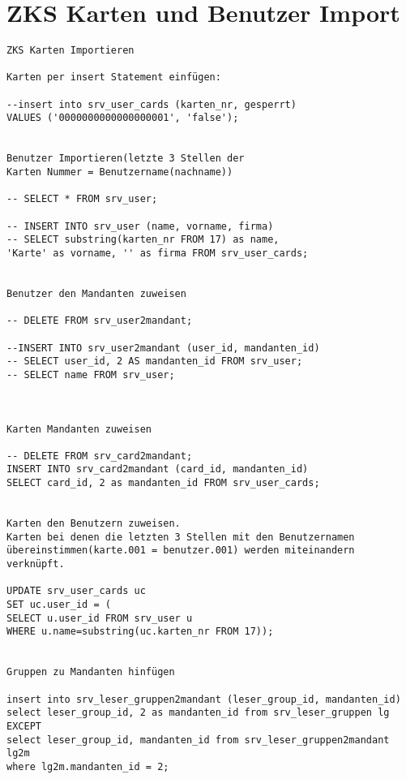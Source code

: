 \documentclass[a4paper,10pt]{report}
\begin{document}
\section{ZKS Karten und Benutzer Import}
\begin{verbatim}
ZKS Karten Importieren

Karten per insert Statement einfügen:

--insert into srv_user_cards (karten_nr, gesperrt) 
VALUES ('0000000000000000001', 'false');


Benutzer Importieren(letzte 3 Stellen der 
Karten Nummer = Benutzername(nachname))

-- SELECT * FROM srv_user;

-- INSERT INTO srv_user (name, vorname, firma)
-- SELECT substring(karten_nr FROM 17) as name, 
'Karte' as vorname, '' as firma FROM srv_user_cards;


Benutzer den Mandanten zuweisen

-- DELETE FROM srv_user2mandant;

--INSERT INTO srv_user2mandant (user_id, mandanten_id)
-- SELECT user_id, 2 AS mandanten_id FROM srv_user;
-- SELECT name FROM srv_user;



Karten Mandanten zuweisen

-- DELETE FROM srv_card2mandant;
INSERT INTO srv_card2mandant (card_id, mandanten_id)
SELECT card_id, 2 as mandanten_id FROM srv_user_cards;


Karten den Benutzern zuweisen. 
Karten bei denen die letzten 3 Stellen mit den Benutzernamen 
übereinstimmen(karte.001 = benutzer.001) werden miteinandern verknüpft.

UPDATE srv_user_cards uc
SET uc.user_id = (
SELECT u.user_id FROM srv_user u 
WHERE u.name=substring(uc.karten_nr FROM 17));


Gruppen zu Mandanten hinfügen

insert into srv_leser_gruppen2mandant (leser_group_id, mandanten_id)
select leser_group_id, 2 as mandanten_id from srv_leser_gruppen lg
EXCEPT 
select leser_group_id, mandanten_id from srv_leser_gruppen2mandant lg2m
where lg2m.mandanten_id = 2;



\end{verbatim}
\end{document}
